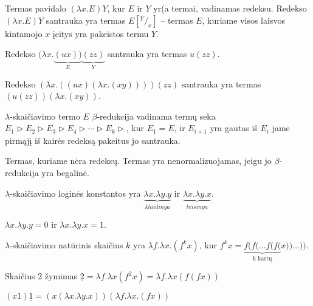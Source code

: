\begin{defn}
  Termas pavidalo $(\lambda x.E)Y$, kur $E$ ir $Y$ yr(a termai, vadinamas
  redeksu. Redekso $(\lambda x.E)Y$ santrauka yra termas $E[^Y/_x]$
  – termas $E$, kuriame visos laisvos kintamojo $x$ įeitys yra pakeistos
  termu $Y$.
  \begin{exmp}
    Redekso $(\lambda x.\underbrace{(ux))}_{E}\underbrace{(zz)}_{Y}$
    santrauka yra termas $u(zz)$.
  \end{exmp}
  \begin{exmp}
    Redekso $(\lambda x.((ux)(\lambda x.(xy))))(zz)$ santrauka yra 
    termas $(u(zz))(\lambda x.(xy))$.
  \end{exmp}
\end{defn}

\begin{defn}
  $\lambda$-skaičiavimo termo $E$ $\beta$-redukcija vadinama termų seka
  $E_1 \triangleright E_2 \triangleright E_3 \triangleright %
  E_4 \triangleright \cdots \triangleright E_k \triangleright$, kur
  $E_1 = E$, ir $E_{i+1}$ yra gautas iš $E_{i}$ jame pirmąjį iš kairės 
  redeksą pakeitus jo santrauka.
\end{defn}

\begin{defn}
  Termas, kuriame nėra redeksų. Termas yra nenormalizuojamas, jeigu jo 
  $\beta$-redukcija yra begalinė.
\end{defn}

\begin{defn}
  $\lambda$-skaičiavimo loginės konstantos yra 
  $\underbrace{\lambda x.\lambda y.y}_{klaidinga}$ ir 
  $\underbrace{\lambda x.\lambda y.x}_{teisinga}$.
  \begin{notation}
    $\lambda x.\lambda y.y = 0$ ir $\lambda x.\lambda y.x = 1$.
  \end{notation}
\end{defn}

\begin{defn}
  $\lambda$-skaičiavimo natūrinis skaičius $k$ yra 
  $\lambda f.\lambda x.(f^{k} x)$, kur
  $f^{k} x = \underbrace{f(f(\dots f(f(}_{\text{k kartų}} x ))\dots))$.
  \begin{notation}
    Skaičius 2 žymimas 
    $\underline{2} = \lambda f.\lambda x(f^{2} x) =%
    \lambda f.\lambda x(f(fx))$
  \end{notation}
\end{defn}

\begin{exmp}
  $(x1)\underline{1} = (x(\lambda x.\lambda y.x))(\lambda f.\lambda x.(fx))$
\end{exmp}

